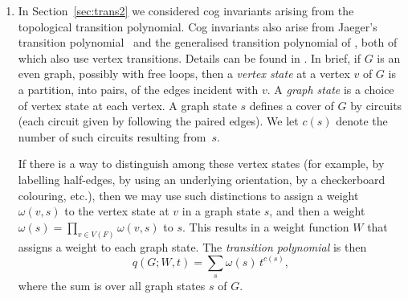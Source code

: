 \documentclass{amsart}
\theoremstyle{definition}
\theoremstyle{remark}
\numberwithin{equation}{section}
\begin{document}
\begin{enumerate}
\begin{proof}
The orientable genus range is the same as the oriented genus range.
The oriented embeddings for the given cog form a reversal-equivalence class.
Consider one such oriented embedding.
Reversal at a vertex $v$ may change the number of faces incident with $v$, although the number of faces not incident with $v$ does not change.  But the number of faces incident with $v$ is a number in the range $[1,4]$, and it can only change by an even number since the Euler characteristic must be even.  So the only possible changes are $0$ and $\pm 2$, which means the orientable genus changes by $0$ or $\pm 1$. Therefore, by starting with an oriented embedding of minimum genus for a cog, and performing a sequence of vertex reversals to reach an oriented embedding of maximum genus for that cog, we must go through an interval of values.  Thus, the oriented, or orientable, genus range is an interval.
\end{proof}

Classical questions in topological graph theory have cog analogues. For example finding a characterisation for upper-embeddable cogs, i.e.~those with orientable embeddings having only one face, analogous to that for abstract graphs (see \cite{MR532590} and \cite{MR286713}). Or, more generally, determining the maximum orientable genus of cogs.

\item  \label{fs.2} In Section~\ref{sec:trans2} we considered cog invariants arising from the topological transition polynomial. Cog invariants also arise from Jaeger's transition polynomial~\cite{MR1096990} and the 
 generalised transition polynomial of  \cite{MR1980048}, both of which also use vertex transitions. Details can be found in \cite[Section 13.3.5]{zbMATH07680507}. In brief, if $G$ is an even graph, possibly with free loops, then  
a \emph{vertex state} at a vertex $v$ of $G$ is a partition, into pairs, of the edges incident with $v$. A \emph{graph state} is a choice of vertex state at each vertex. 
A graph state $s$ defines a cover of $G$ by circuits (each circuit given by following the paired edges). We let $c(s)$ denote the number of such circuits resulting \mbox{from $s$.}  

If there is a way to distinguish among these vertex states (for example, by labelling half-edges, by using an underlying orientation, by a checkerboard colouring, etc.), then we may use such distinctions to assign a weight $\omega(v,s)$ to the vertex state at $v$ in a graph state $s$, and then a weight $\omega(s) = \prod_{v \in V(F)} {\omega(v,s)}$ to $s$. This results in a weight function $W$ that assigns a weight to each graph state.
The \emph{transition polynomial} is then
\begin{equation}\label{EMMmedial:sdhi}
q(G; W,t)= \sum_{s} {\omega( s ) \,t^{c(s)} },
\end{equation} 
where the sum  is over all graph states $s$ of $G$.  


\end{enumerate}
\end{document}
